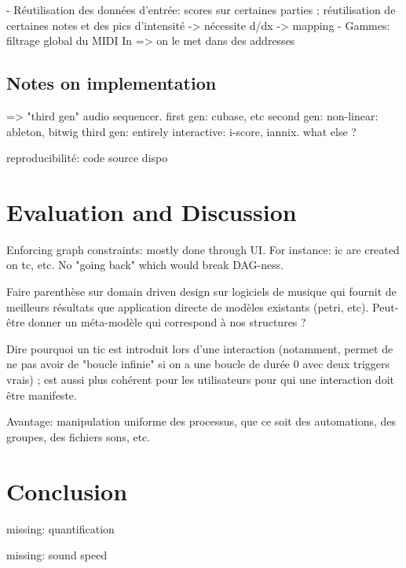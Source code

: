 \documentclass[applsci,article,submit,moreauthors,pdftex,10pt,a4paper]{mdpi}
\begin{document}
- Réutilisation des données d'entrée: scores sur certaines parties ; réutilisation de certaines notes et des pics d'intensité -> nécessite d/dx -> mapping
- Gammes: filtrage global du MIDI In => on le met dans des addresses

\subsection{Notes on implementation}


=> "third gen" audio sequencer.
first gen: cubase, etc
second gen: non-linear: ableton, bitwig
third gen: entirely interactive: i-score, iannix. what else ? 

reproducibilité: code source dispo
\section{Evaluation and Discussion}
Enforcing graph constraints: mostly done through UI. For instance: ic are created on tc, etc. No "going back" which would break DAG-ness.

Faire parenthèse sur domain driven design sur logiciels de musique qui fournit de meilleurs résultats que application directe de modèles existants (petri, etc).
Peut-être donner un méta-modèle qui correspond à nos structures ?

Dire pourquoi un tic est introduit lors d'une interaction (notamment, permet de ne pas avoir de "boucle infinie" si on a une boucle de durée 0 avec deux triggers vrais) ; est aussi plus cohérent pour les utilisateurs pour qui une interaction doit être manifeste.

Avantage: manipulation uniforme des processus, que ce soit des automations, des groupes, des fichiers sons, etc.
\section{Conclusion}

missing: quantification

missing: sound speed


\end{document}
